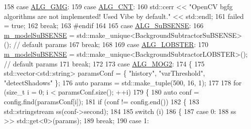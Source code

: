 \begin{DoxyCode}
158         \textcolor{keywordflow}{case} \mbox{\hyperlink{class_background_subtract_a56850081696df68b55f87b4f3d87949fa3d46f57cfb0a9b1b5b037b387a35f652}{ALG\_GMG}}:
159         \textcolor{keywordflow}{case} \mbox{\hyperlink{class_background_subtract_a56850081696df68b55f87b4f3d87949fa4e734ae21b8add9022427f8da9469cfb}{ALG\_CNT}}:
160             std::cerr << \textcolor{stringliteral}{"OpenCV bgfg algorithms are not implemented! Used Vibe by default."} << std::endl;
161             failed = \textcolor{keyword}{true};
162             \textcolor{keywordflow}{break};
163 \textcolor{preprocessor}{#endif}
164 
165         \textcolor{keywordflow}{case} \mbox{\hyperlink{class_background_subtract_a56850081696df68b55f87b4f3d87949fa0a4e184ec94bca58e58dd4226f1b1f7f}{ALG\_SuBSENSE}}:
166             \mbox{\hyperlink{class_background_subtract_a56275963c8cacca97b97d0cde884f4c1}{m\_modelSuBSENSE}} = std::make\_unique<BackgroundSubtractorSuBSENSE>(); \textcolor{comment}{// default
       params}
167             \textcolor{keywordflow}{break};
168 
169         \textcolor{keywordflow}{case} \mbox{\hyperlink{class_background_subtract_a56850081696df68b55f87b4f3d87949fae4cc76d1ae01949bc7e6be6ed046ddaf}{ALG\_LOBSTER}}:
170             \mbox{\hyperlink{class_background_subtract_a56275963c8cacca97b97d0cde884f4c1}{m\_modelSuBSENSE}} = std::make\_unique<BackgroundSubtractorLOBSTER>();  \textcolor{comment}{// default
       params}
171             \textcolor{keywordflow}{break};
172 
173         \textcolor{keywordflow}{case} \mbox{\hyperlink{class_background_subtract_a56850081696df68b55f87b4f3d87949fa35994e745da8eb824d3808ee50ad3ebf}{ALG\_MOG2}}:
174         \{
175             std::vector<std::string> paramsConf = \{ \textcolor{stringliteral}{"history"}, \textcolor{stringliteral}{"varThreshold"}, \textcolor{stringliteral}{"detectShadows"} \};
176             \textcolor{keyword}{auto} params = std::make\_tuple(500, 16, 1);
177 
178             \textcolor{keywordflow}{for} (\textcolor{keywordtype}{size\_t} i = 0; i < paramsConf.size(); ++i)
179             \{
180                 \textcolor{keyword}{auto} conf = config.find(paramsConf[i]);
181                 \textcolor{keywordflow}{if} (conf != config.end())
182                 \{
183                     std::stringstream ss(conf->second);
184 
185                     \textcolor{keywordflow}{switch} (i)
186                     \{
187                     \textcolor{keywordflow}{case} 0:
188                         ss >> std::get<0>(params);
189                         \textcolor{keywordflow}{break};
190                     \textcolor{keywordflow}{case} 1:

\end{DoxyCode}
